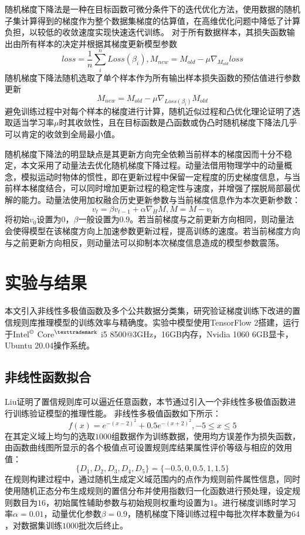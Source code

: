 \documentclass{cjc}
\begin{document}
随机梯度下降法\cite{a17}是一种在目标函数可微分条件下的迭代优化方法，使用数据的随机子集计算得到的梯度作为整个数据集梯度的估算值，在高维优化问题中降低了计算负担，以较低的收敛速度实现快速迭代训练。  
对于所有数据样本，其损失函数输出由所有样本的决定并根据其梯度更新模型参数
$$loss=\frac{1}{n}\sum_i^nLoss(\beta_i),M_{new}=M_{old}-\mu\nabla_{M_{old}}loss$$
随机梯度下降法随机选取了单个样本作为所有输出样本损失函数的预估值进行参数更新
$$M_{new}=M_{old}-\mu\nabla_{Loss(\beta_i)}M_{old}$$
避免训练过程中对每个样本的梯度进行计算，随机近似过程和凸优化理论\cite{a18}证明了选取适当学习率$\mu$时其收敛性，且在目标函数是凸函数或伪凸时随机梯度下降法几乎可以肯定的收敛到全局最小值。

随机梯度下降法的明显缺点是其更新方向完全依赖当前样本的梯度因而十分不稳定，本文采用了动量法\cite{a19}去优化随机梯度下降过程。动量法借用物理学中的动量概念，模拟运动时物体的惯性，即在更新过程中保留一定程度的历史梯度信息，与当前样本梯度结合，可以同时增加更新过程的稳定性与速度，并增强了摆脱局部最优解的能力。动量法使用加权融合历史更新参数与当前梯度信息作为本次更新参数：
$$v_t=\beta v_{t-1}+\alpha\nabla_HM,M=M-v_t$$
将初始$v_0$设置为$0$，$\beta$一般设置为$0.9$。若当前梯度与之前更新方向相同，则动量法会使得模型在该梯度方向上加速参数更新过程，提高训练的速度。若当前梯度方向与之前更新方向相反，则动量法可以抑制本次梯度信息造成的模型参数震荡。
\section{实验与结果}
本文引入非线性多极值函数及多个公共数据分类集，研究验证梯度训练下改进的置信规则库推理模型的训练效率与精确度。实验中模型使用TensorFlow 2搭建，运行于Intel$^{\copyright}$ Core$^{\texttrademark}$ i5 8500@3GHz，16GB内存，Nvidia 1060 6GB显卡，Ubuntu 20.04操作系统。
\subsection{非线性函数拟合}
Liu\cite{a15}证明了置信规则库可以逼近任意函数，本节通过引入一个非线性多极值函数进行训练验证模型的推理性能。  
非线性多极值函数如下所示：
$$f(x)=e^{-(x-2)^2}+0.5e^{-(x+2)^2},-5\leq x\leq 5$$
在其定义域上均匀的选取$1000$组数据作为训练数据，使用均方误差作为损失函数，由函数曲线图所显示的各个极值点可设置规则库结果属性评价等级与相应的效用值：
$$\{D_1,D_2,D_3,D_4,D_5\}=\{-0.5,0,0.5,1,1.5\}$$
在规则构建过程中，通过随机生成定义域范围内的点作为规则前件属性信息，同时使用随机正态分布生成规则的置信分布并使用指数归一化函数进行预处理，设定规则数目为$16$，初始属性辅助参数与初始规则权重均设置为$1$。进行梯度训练时学习率$\alpha=0.01$，动量优化参数$\beta=0.9$，随机梯度下降训练过程中每批次样本数量为$64$，对数据集训练$1000$批次后终止。
\end{document}
